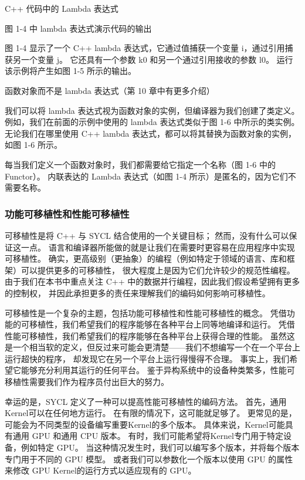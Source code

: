 {\color{red} C++ 代码中的 Lambda 表达式 }

{\color{red} 图 1-4 中 lambda 表达式演示代码的输出 }

图 1-4 显示了一个 C++ lambda 表达式，它通过值捕获一个变量 i，通过引用捕获另一个变量 j。 
它还具有一个参数 k0 和另一个通过引用接收的参数 l0。 运行该示例将产生如图 1-5 所示的输出。

{\color{red} 函数对象而不是 lambda 表达式（第 10 章中有更多介绍）}

我们可以将 lambda 表达式视为函数对象的实例，但编译器为我们创建了类定义。 
例如，我们在前面的示例中使用的 lambda 表达式类似于图 1-6 中所示的类实例。 
无论我们在哪里使用 C++ lambda 表达式，都可以将其替换为函数对象的实例，如图 1-6 所示。

每当我们定义一个函数对象时，我们都需要给它指定一个名称（图 1-6 中的 Functor）。 
内联表达的 Lambda 表达式（如图 1-4 所示）是匿名的，因为它们不需要名称。

\subsubsection{功能可移植性和性能可移植性}
可移植性是将 C++ 与 SYCL 结合使用的一个关键目标； 然而，没有什么可以保证这一点。 
语言和编译器所能做的就是让我们在需要时更容易在应用程序中实现可移植性。 
确实，更高级别（更抽象）的编程（例如特定于领域的语言、库和框架）可以提供更多的可移植性，
很大程度上是因为它们允许较少的规范性编程。 
由于我们在本书中重点关注 C++ 中的数据并行编程，因此我们假设希望拥有更多的控制权，
并因此承担更多的责任来理解我们的编码如何影响可移植性。

可移植性是一个复杂的主题，包括功能可移植性和性能可移植性的概念。 
凭借功能的可移植性，我们希望我们的程序能够在各种平台上同等地编译和运行。 
凭借性能可移植性，我们希望我们的程序能够在各种平台上获得合理的性能。 
虽然这是一个相当软的定义，但反过来可能会更清楚——我们不想编写一个在一个平台上运行超快的程序，
却发现它在另一个平台上运行得慢得不合理。 事实上，我们希望它能够充分利用其运行的任何平台。 
鉴于异构系统中的设备种类繁多，性能可移植性需要我们作为程序员付出巨大的努力。

幸运的是，SYCL 定义了一种可以提高性能可移植性的编码方法。 首先，通用Kernel可以在任何地方运行。 
在有限的情况下，这可能就足够了。 更常见的是，可能会为不同类型的设备编写重要Kernel的多个版本。 
具体来说，Kernel可能具有通用 GPU 和通用 CPU 版本。 有时，我们可能希望将Kernel专门用于特定设备，例如特定 GPU。 
当这种情况发生时，我们可以编写多个版本，并将每个版本专门用于不同的 GPU 模型。 
或者我们可以参数化一个版本以使用 GPU 的属性来修改 GPU Kernel的运行方式以适应现有的 GPU。


